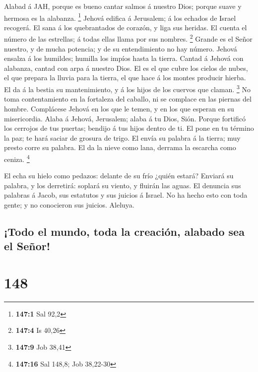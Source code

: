 Alabad á JAH, porque es bueno cantar salmos á nuestro Dios;
porque suave y hermosa es la alabanza. \footnote{\textbf{147:1} Sal 92,2}
 Jehová edifica á Jerusalem; á los echados de Israel
recogerá.  El sana á los quebrantados de corazón, y liga sus
heridas.  El cuenta el número de las estrellas; á todas
ellas llama por sus nombres. \footnote{\textbf{147:4} Is 40,26}
 Grande es el Señor nuestro, y de mucha potencia; y de su
entendimiento no hay número.  Jehová ensalza á los humildes;
humilla los impíos hasta la tierra.  Cantad á Jehová con
alabanza, cantad con arpa á nuestro Dios.  El es el que
cubre los cielos de nubes, el que prepara la lluvia para la tierra, el
que hace á los montes producir hierba.  El da á la bestia su
mantenimiento, y á los hijos de los cuervos que claman. \footnote{\textbf{147:9}
  Job 38,41}  No toma contentamiento en la fortaleza del
caballo, ni se complace en las piernas del hombre. 
Complácese Jehová en los que le temen, y en los que esperan en su
misericordia.  Alaba á Jehová, Jerusalem; alaba á tu Dios,
Sión.  Porque fortificó los cerrojos de tus puertas;
bendijo á tus hijos dentro de ti.  El pone en tu término la
paz; te hará saciar de grosura de trigo.  El envía su
palabra á la tierra; muy presto corre su palabra.  El da la
nieve como lana, derrama la escarcha como ceniza. \footnote{\textbf{147:16}
  Sal 148,8; Job 38,22-30}

 El echa su hielo como pedazos: delante de su frío ¿quién
estará?  Enviará su palabra, y los derretirá: soplará su
viento, y fluirán las aguas.  El denuncia sus palabras á
Jacob, sus estatutos y sus juicios á Israel.  No ha hecho
esto con toda gente; y no conocieron sus juicios. Aleluya.

\hypertarget{todo-el-mundo-toda-la-creaciuxf3n-alabado-sea-el-seuxf1or}{%
\subsection{¡Todo el mundo, toda la creación, alabado sea el
Señor!}\label{todo-el-mundo-toda-la-creaciuxf3n-alabado-sea-el-seuxf1or}}

\hypertarget{section-147}{%
\section{148}\label{section-147}}

